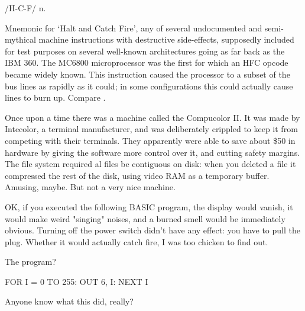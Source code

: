 /H-C-F/ n.

Mnemonic for `Halt and Catch Fire', any of several undocumented and semi-mythical machine instructions with destructive side-effects,
supposedly included for test purposes on several well-known architectures going as far back as the IBM 360. The MC6800 microprocessor was
the first for which an HFC opcode became widely known. This instruction caused the processor to  a subset of the bus
lines as rapidly as it could; in some configurations this could actually cause lines to burn up. Compare .

\begin{usenet}
	Once upon a time there was a machine called the Compucolor II. It was made by
	Intecolor, a terminal manufacturer, and was deliberately crippled to keep it
	from competing with their terminals. They apparently were able to save about
	\$50 in hardware by giving the software more control over it, and cutting
	safety margins. The file system required al files be contiguous on disk: when
	you deleted a file it compressed the rest of the disk, using video RAM as a
	temporary buffer. Amusing, maybe. But not a very nice machine.

	OK, if you executed the following BASIC program, the display would vanish, it
	would make weird "singing" noises, and a burned smell would be immediately
	obvious. Turning off the power switch didn't have any effect: you have to 
	pull the plug. Whether it would actually catch fire, I was too chicken to find
	out.

	The program?

	\begin{usenet}
		FOR I = 0 TO 255: OUT 6, I: NEXT I

		Anyone know what this did, really?
	\end{usenet}

\end{usenet}

